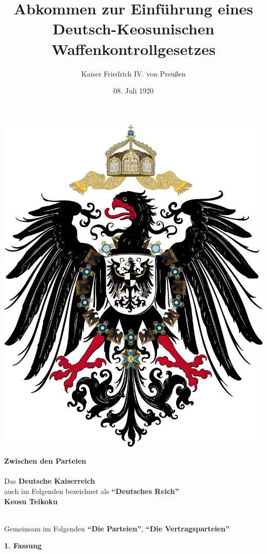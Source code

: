 \documentclass{article}
\title{Abkommen zur Einführung eines Deutsch-Keosunischen Waffenkontrollgesetzes}
\author{Kaiser Friedrich IV. von Preußen}
\date{08. Juli 1920}
\begin{document}
\maketitle
\begin{center}
    \includegraphics[scale=.15]{dr_wappen}
\end{center}
\begin{center}
    \textbf{Zwischen den Parteien\\}\textbf{\\}
    Das \textbf{Deutsche Kaiserreich\\} auch im Folgenden bezeichnet als \textbf{``Deutsches Reich''\\}
    \textbf{Keosu Teikoku\\}\textbf{\\}

    Gemeinsam im Folgenden \textbf{``Die Parteien''}, \textbf{``Die Vertragsparteien''}
\end{center}
\newpage
{}
\vspace*{\fill}
\begin{Center}
\textbf{1. Fassung}
\vspace*{\fill}
\end{Center}
\newpage
\tableofcontents
\newpage
\end{document}
